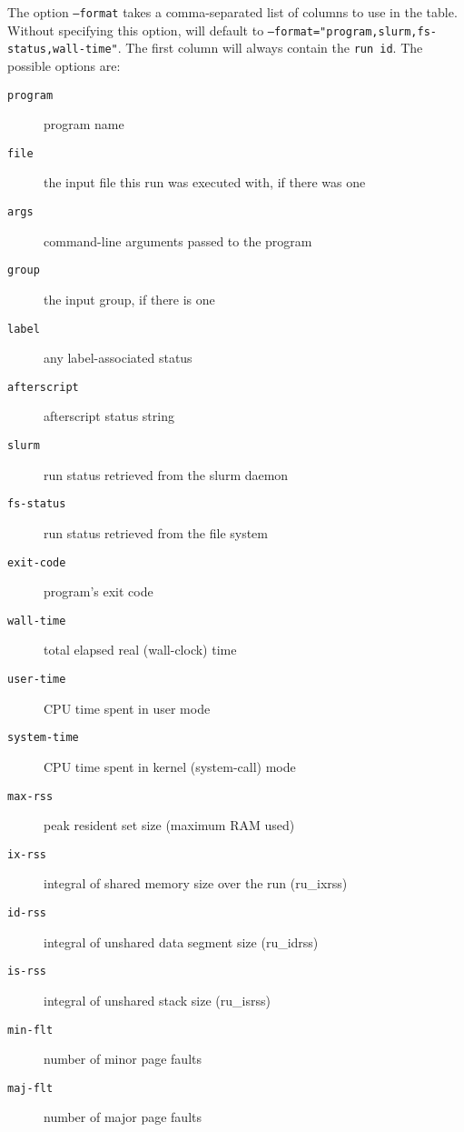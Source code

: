 \documentclass[a4paper,english]{article}
\begin{document}
\begin{adjustwidth}{18pt}{0pt}
                The option \texttt{--format} takes a comma-separated list of columns to use
                in the table. Without specifying this option,  will default to
                \texttt{--format="program,slurm,fs-status,wall-time"}. The first column will 
                always contain the \texttt{run id}.
                The possible options are:
                \begin{description}
                    \item[\texttt{program}] program name
                    \item[\texttt{file}] the input file this run was executed with, if there was one
                    \item[\texttt{args}] command-line arguments passed to the program
                    \item[\texttt{group}] the input group, if there is one
                    \item[\texttt{label}] any label-associated status
                    \item[\texttt{afterscript}] afterscript status string
                    \item[\texttt{slurm}] run status retrieved from the slurm daemon
                    \item[\texttt{fs-status}] run status retrieved from the file system
                    \item[\texttt{exit-code}] program's exit code
                    \item[\texttt{wall-time}] total elapsed real (wall-clock) time
                    \item[\texttt{user-time}] CPU time spent in user mode
                    \item[\texttt{system-time}] CPU time spent in kernel (system-call) mode
                    \item[\texttt{max-rss}] peak resident set size (maximum RAM used)
                    \item[\texttt{ix-rss}] integral of shared memory size over the run (ru\_ixrss)
                    \item[\texttt{id-rss}] integral of unshared data segment size (ru\_idrss)
                    \item[\texttt{is-rss}] integral of unshared stack size (ru\_isrss)
                    \item[\texttt{min-flt}] number of minor page faults
                    \item[\texttt{maj-flt}] number of major page faults

\end{description}
\end{adjustwidth}
\end{document}
